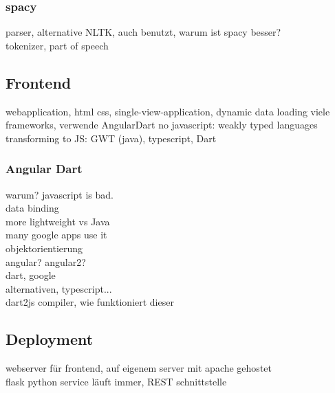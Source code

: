 \subsubsection{spacy}
parser, alternative NLTK, auch benutzt, warum ist spacy besser?\\
tokenizer, part of speech

\subsection{Frontend}

webapplication, html css, single-view-application, dynamic data loading
viele frameworks, verwende AngularDart
no javascript: weakly typed languages transforming to JS: GWT (java), typescript, Dart

\subsubsection{Angular Dart}
warum? javascript is bad.\\

data binding\\
more lightweight vs Java\\

many google apps use it\\
objektorientierung\\

angular? angular2?\\

dart, google\\
alternativen, typescript...\\

dart2js compiler, wie funktioniert dieser\\

\subsection{Deployment}

webserver für frontend, auf eigenem server mit apache gehostet\\
flask python service läuft immer, REST schnittstelle\\






